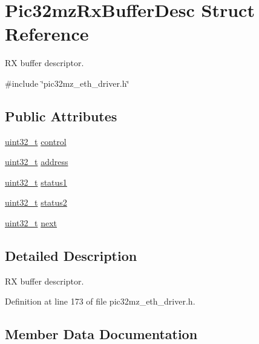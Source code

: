 \hypertarget{structPic32mzRxBufferDesc}{}\section{Pic32mz\+Rx\+Buffer\+Desc Struct Reference}
\label{structPic32mzRxBufferDesc}


RX buffer descriptor.  




{\ttfamily \#include \char`\"{}pic32mz\+\_\+eth\+\_\+driver.\+h\char`\"{}}

\subsection*{Public Attributes}
\begin{DoxyCompactItemize}
\item 
\hyperlink{stdint_8h_a435d1572bf3f880d55459d9805097f62}{uint32\+\_\+t} \hyperlink{structPic32mzRxBufferDesc_a6c5d412967f5321269566980ba585303}{control}
\item 
\hyperlink{stdint_8h_a435d1572bf3f880d55459d9805097f62}{uint32\+\_\+t} \hyperlink{structPic32mzRxBufferDesc_a834826db2f21266e8e4b18ffa428b8cc}{address}
\item 
\hyperlink{stdint_8h_a435d1572bf3f880d55459d9805097f62}{uint32\+\_\+t} \hyperlink{structPic32mzRxBufferDesc_a2f6dacf436998ffbd815f2cb4366457e}{status1}
\item 
\hyperlink{stdint_8h_a435d1572bf3f880d55459d9805097f62}{uint32\+\_\+t} \hyperlink{structPic32mzRxBufferDesc_a86067cf8e17a8a2d204b251022cd55ce}{status2}
\item 
\hyperlink{stdint_8h_a435d1572bf3f880d55459d9805097f62}{uint32\+\_\+t} \hyperlink{structPic32mzRxBufferDesc_a985d45d76d242c516732f87206bac3d3}{next}
\end{DoxyCompactItemize}


\subsection{Detailed Description}
RX buffer descriptor. 

Definition at line 173 of file pic32mz\+\_\+eth\+\_\+driver.\+h.



\subsection{Member Data Documentation}
\mbox{\label{structPic32mzRxBufferDesc_a834826db2f21266e8e4b18ffa428b8cc}} 
